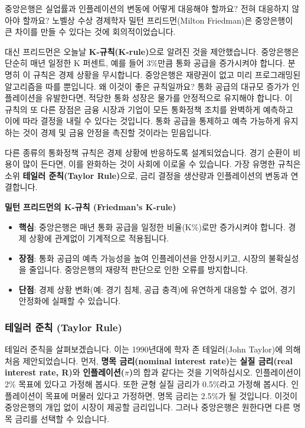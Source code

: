\documentclass[11pt,a4paper]{article}
\begin{document}
중앙은행은 실업률과 인플레이션의 변동에 어떻게 대응해야 할까요? 전혀 대응하지 않아야 할까요? 노벨상 수상 경제학자 밀턴 프리드먼(Milton Friedman)은 중앙은행이 큰 차이를 만들 수 있다는 것에 회의적이었습니다.

대신 프리드먼은 오늘날 \textbf{K-규칙(K-rule)}으로 알려진 것을 제안했습니다. 중앙은행은 단순히 매년 일정한 K 퍼센트, 예를 들어 3\%만큼 통화 공급을 증가시켜야 합니다. 분명히 이 규칙은 경제 상황을 무시합니다. 중앙은행은 재량권이 없고 미리 프로그래밍된 알고리즘을 따를 뿐입니다. 왜 이것이 좋은 규칙일까요? 통화 공급의 대규모 증가가 인플레이션을 유발한다면, 적당한 통화 성장은 물가를 안정적으로 유지해야 합니다. 이 규칙의 또 다른 장점은 금융 시장과 기업이 모든 통화정책 조치를 완벽하게 예측하고 이에 따라 결정을 내릴 수 있다는 것입니다. 통화 공급을 통제하고 예측 가능하게 유지하는 것이 경제 및 금융 안정을 촉진할 것이라는 믿음입니다.

다른 종류의 통화정책 규칙은 경제 상황에 반응하도록 설계되었습니다. 경기 순환이 비용이 많이 든다면, 이를 완화하는 것이 사회에 이로울 수 있습니다. 가장 유명한 규칙은 소위 \textbf{테일러 준칙(Taylor Rule)}으로, 금리 결정을 생산량과 인플레이션의 변동과 연결합니다.

\begin{conceptbox}
\textbf{밀턴 프리드먼의 K-규칙 (Friedman's K-rule)}
\begin{itemize}
    \item \textbf{핵심}: 중앙은행은 매년 통화 공급을 일정한 비율(K\%)로만 증가시켜야 합니다. 경제 상황에 관계없이 기계적으로 적용됩니다.
    \item \textbf{장점}: 통화 공급의 예측 가능성을 높여 인플레이션을 안정시키고, 시장의 불확실성을 줄입니다. 중앙은행의 재량적 판단으로 인한 오류를 방지합니다.
    \item \textbf{단점}: 경제 상황 변화(예: 경기 침체, 공급 충격)에 유연하게 대응할 수 없어, 경기 안정화에 실패할 수 있습니다.
\end{itemize}
\end{conceptbox}

\subsubsection*{테일러 준칙 (Taylor Rule)}

테일러 준칙을 살펴보겠습니다. 이는 1990년대에 학자 존 테일러(John Taylor)에 의해 처음 제안되었습니다. 먼저, \textbf{명목 금리(nominal interest rate)}는 \textbf{실질 금리(real interest rate, R)}와 \textbf{인플레이션($\pi$)}의 합과 같다는 것을 기억하십시오. 인플레이션이 2\% 목표에 있다고 가정해 봅시다. 또한 균형 실질 금리가 0.5\%라고 가정해 봅시다. 인플레이션이 목표에 머물러 있다고 가정하면, 명목 금리는 2.5\%가 될 것입니다. 이것이 중앙은행의 개입 없이 시장이 제공할 금리입니다. 그러나 중앙은행은 원한다면 다른 명목 금리를 선택할 수 있습니다.
\end{document}
